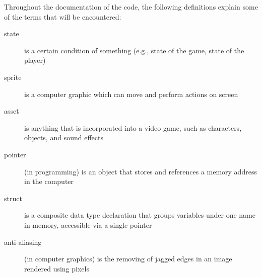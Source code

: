 Throughout the documentation of the code, the following definitions explain
some of the terms that will be encountered:

\begin{description}
    \item[state]{is a certain condition of something (e.g., state of the game, state of the player)}
    \item[sprite]{is a computer graphic which can move and perform actions on screen}
    \item[asset]{is anything that is incorporated into a video game, such as characters, objects, and sound effects}
    \item[pointer]{(in programming) is an object that stores and references a memory address in the computer}
    \item[struct]{is a composite data type declaration that groups variables under one name in memory, accessible via a single pointer} 
    \item[anti-aliasing]{(in computer graphics) is the removing of jagged edges in an image rendered using pixels}
\end{description}
